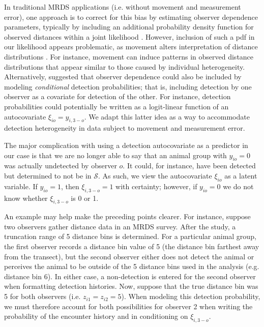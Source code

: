 \documentclass[aoas,preprint]{imsart}
\numberwithin{equation}{section}
\theoremstyle{plain}
\begin{document}
In traditional MRDS applications (i.e. without movement and measurement error), one approach is to correct for this bias by estimating observer dependence parameters, typically by including an additional probability density function for observed distances within a joint likelihood \citep[cf.][]{BucklandEtAl2010}.  However, inclusion of such a pdf in our likelihood appears problematic, as movement alters interpretation of distance distributions \citep{BurtEtAl2014}. For instance, movement can induce patterns in observed distance distributions that appear similar to those caused by individual heterogeneity.  Alternatively, \citet{MacKenzieClement2016} suggested that observer dependence could also be included by modeling \textit{conditional} detection probabilities; that is, including detection by one observer as a covariate for detection of the other.  For instance, detection probabilities could potentially be written as a logit-linear function of an autocovariate $\xi_{io} = y_{i,3-o}$.  We adapt this latter idea as a way to accommodate detection heterogeneity in data subject to movement and measurement error.

The major complication with using a detection autocovariate as a predictor in our case is that we are no longer able to say that an animal group with $y_{io}=0$ was actually undetected by observer $o$.  It could, for instance, have been detected but determined to not be in $\mathcal{S}$.  As such, we view the autocovariate $\xi_{io}$ as a latent variable.  If $y_{io}=1$, then $\xi_{i,3-o}=1$ with certainty; however, if $y_{io}=0$ we do not know whether $\xi_{i,3-o}$ is 0 or 1.

An example may help make the preceding points clearer.  For instance, suppose two observers gather distance data in an MRDS survey.  After the study, a truncation range of 5 distance bins is determined.  For a particular animal group, the first observer records a distance bin value of 5 (the distance bin farthest away from the transect), but the second observer either does not detect the animal or perceives the animal to be outside of the 5 distance bins used in the analysis (e.g. distance bin 6). In either case, a non-detection is entered for the second observer when formatting detection histories. Now, suppose that the true distance bin was 5 for both observers (i.e. $z_{i1}=z_{i2}=5$).  When modeling this detection probability, we must therefore account for both possibilities for observer 2 when writing the probability of the encounter history and in conditioning on $\xi_{i,3-o}$.
\end{document}
